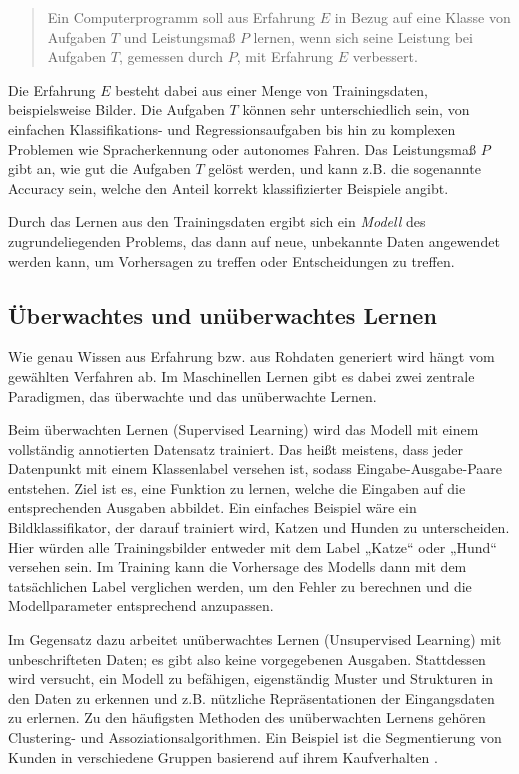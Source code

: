 \begin{quote}
	Ein Computerprogramm soll aus Erfahrung $E$ in Bezug auf eine Klasse von Aufgaben $T$ und Leistungsmaß $P$ lernen, wenn sich seine Leistung bei Aufgaben $T$, gemessen durch $P$, mit Erfahrung $E$ verbessert.
\end{quote}

Die Erfahrung $E$ besteht dabei aus einer Menge von Trainingsdaten, beispielsweise Bilder. Die Aufgaben $T$ können sehr unterschiedlich sein, von einfachen Klassifikations- und Regressionsaufgaben bis hin zu komplexen Problemen wie Spracherkennung oder autonomes Fahren. Das Leistungsmaß $P$ gibt an, wie gut die Aufgaben $T$ gelöst werden, und kann z.B. die sogenannte Accuracy sein, welche den Anteil korrekt klassifizierter Beispiele angibt.

Durch das Lernen aus den Trainingsdaten ergibt sich ein \emph{Modell} des zugrundeliegenden Problems, das dann auf neue, unbekannte Daten angewendet werden kann, um Vorhersagen zu treffen oder Entscheidungen zu treffen.

\subsection{Überwachtes und unüberwachtes Lernen} \label{subsec:sup-unsup}

Wie genau Wissen aus Erfahrung bzw. aus Rohdaten generiert wird hängt vom gewählten Verfahren ab. Im Maschinellen Lernen gibt es dabei zwei zentrale Paradigmen, das überwachte und das unüberwachte Lernen.

Beim überwachten Lernen (Supervised Learning) wird das Modell mit einem vollständig annotierten Datensatz trainiert. Das heißt meistens, dass jeder Datenpunkt mit einem Klassenlabel versehen ist, sodass Eingabe-Ausgabe-Paare entstehen. Ziel ist es, eine Funktion zu lernen, welche die Eingaben auf die entsprechenden Ausgaben abbildet. Ein einfaches Beispiel wäre ein Bildklassifikator, der darauf trainiert wird, Katzen und Hunden zu unterscheiden. Hier würden alle Trainingsbilder entweder mit dem Label „Katze“ oder „Hund“ versehen sein. Im Training kann die Vorhersage des Modells dann mit dem tatsächlichen Label verglichen werden, um den Fehler zu berechnen und die Modellparameter entsprechend anzupassen.

Im Gegensatz dazu arbeitet unüberwachtes Lernen (Unsupervised Learning) mit unbeschrifteten Daten; es gibt also keine vorgegebenen Ausgaben. Stattdessen wird versucht, ein Modell zu befähigen, eigenständig Muster und Strukturen in den Daten zu erkennen und z.B. nützliche Repräsentationen der Eingangsdaten zu erlernen. Zu den häufigsten Methoden des unüberwachten Lernens gehören Clustering- und Assoziationsalgorithmen. Ein Beispiel ist die Segmentierung von Kunden in verschiedene Gruppen basierend auf ihrem Kaufverhalten \parencite{}.


